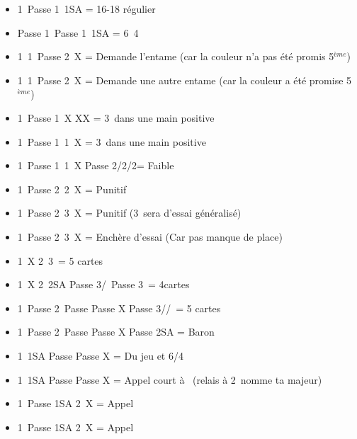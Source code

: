 \documentclass[a4paper, oneside, 11pt]{report}
\begin{document}
\newpage
	\begin{itemize}
	\item 1\trefle\ Passe 1\pique\ 1SA = 16-18 régulier
	\item Passe 1\trefle\ Passe 1\pique\ 1SA = 6\carreau\ 4\coeur\\

	\item 1\trefle\ 1\pique\ Passe 2\trefle\ X = Demande l'entame (car la couleur n'a pas été promis 5$^{ème}$)
	\item 1\coeur\ 1\pique\ Passe 2\coeur\ X = Demande une autre entame (car la couleur a été promise 5$^{ème}$)\\

	\item 1\carreau\ Passe 1\coeur\ X XX = 3\coeur\ dans une main positive
	\item 1\carreau\ Passe 1\coeur\ 1\pique\ X = 3\coeur\ dans une main positive
	\item 1\carreau\ Passe 1\coeur\ 1\pique\ X Passe 2\trefle/2\carreau/2\coeur = Faible\\

	\item 1\coeur\ Passe 2\coeur\ 2\pique\ X = Punitif
	\item 1\coeur\ Passe 2\coeur\ 3\trefle\ X = Punitif (3\carreau\ sera d'essai généralisé)
	\item 1\coeur\ Passe 2\coeur\ 3\carreau\ X = Enchère d'essai (Car pas manque de place)\\

	\item 1\pique\ X 2\pique\ 3\coeur\ = 5 cartes
	\item 1\pique\ X 2\pique\ 2SA Passe 3\trefle/\carreau\ Passe 3\coeur\ = 4cartes
	\item 1\pique\ Passe 2\pique\ Passe Passe X Passe 3\trefle/\carreau/\coeur\ = 5 cartes
	\item 1\pique\ Passe 2\pique\ Passe Passe X Passe 2SA = Baron\\

	\item 1\coeur\ 1SA Passe Passe X = Du jeu et 6\coeur/4\pique
	\item 1\trefle\ 1SA Passe Passe X = Appel court à \carreau\ (relais à 2\carreau\ nomme ta majeur)\\

	\item 1\pique\ Passe 1SA 2\carreau\ X = Appel
	\item 1\carreau\ Passe 1SA 2\pique\ X = Appel\\


\end{itemize}
\end{document}

